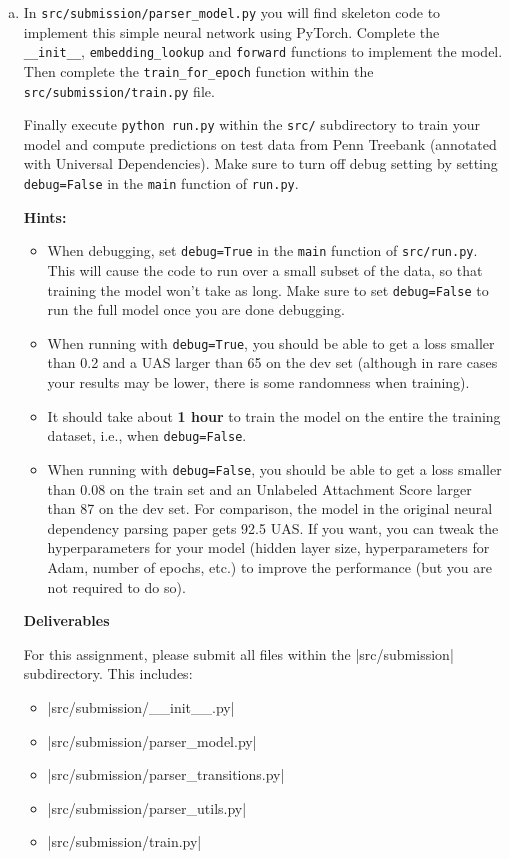 \begin{enumerate}[(a)]
    \item {} In \texttt{src/submission/parser\_model.py} you will find skeleton code to implement this simple neural network using PyTorch. Complete the \texttt{\_\_init\_\_}, \texttt{embedding\_lookup} and \texttt{forward} functions to implement the model. Then complete the \texttt{train\_for\_epoch} function within the \texttt{src/submission/train.py} file. \newline
   
    Finally execute \texttt{python run.py} within the \texttt{src/} subdirectory to train your model and compute predictions
    on test data from Penn Treebank (annotated with Universal Dependencies). Make sure to turn off debug setting by setting \texttt{debug=False} in the \texttt{main} function of \texttt{run.py}.
    
    \textbf{Hints:}
    \begin{itemize}
        \item
            When debugging, set \texttt{debug=True} in the \texttt{main} function of \texttt{src/run.py}. This will cause the code to run over a small subset of the data, so that training the model won't take as long. Make sure to set \texttt{debug=False} to run the full model once you are done debugging.

        \item
            When running with \texttt{debug=True}, you should be able to get a loss smaller than 0.2 and a UAS larger than 65 on the dev set (although in rare cases your results may be lower, there is some randomness when training).
            
        \item It should take about \textbf{1 hour} to train the model on the entire the training dataset, i.e., when \texttt{debug=False}.
        
        \item When running with \texttt{debug=False}, you should be able to get a loss smaller than 0.08 on the train set and an Unlabeled Attachment Score larger than 87 on the dev set. For comparison, the model in the original neural dependency parsing paper gets 92.5 UAS. If you want, you can tweak the hyperparameters for your model (hidden layer size, hyperparameters for Adam, number of epochs, etc.) to improve the performance (but you are not required to do so).
    \end{itemize}
    \clearpage

    \textbf{Deliverables}

    For this assignment, please submit all files within the |src/submission| subdirectory.  This includes:
    \begin{itemize}
        \item |src/submission/__init__.py|
        \item |src/submission/parser_model.py|
        \item |src/submission/parser_transitions.py|
        \item |src/submission/parser_utils.py|
        \item |src/submission/train.py|
    \end{itemize}   
\end{enumerate}
